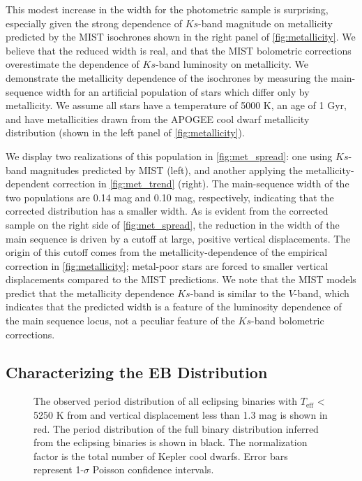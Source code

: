 \documentclass[twocolumn]{aastex6}
\newcommand{\Teff}{\ensuremath{T_{\textrm{eff}}}}
\begin{document}
This modest increase in the width for the photometric sample is surprising,
especially given the strong dependence of \(Ks\)-band magnitude on metallicity 
predicted by the MIST isochrones shown in the right panel of 
\cref{fig:metallicity}. We believe that the reduced width is real, and that 
the MIST bolometric corrections overestimate the dependence of \(Ks\)-band 
luminosity on metallicity. We demonstrate the metallicity dependence of 
the isochrones by measuring the 
main-sequence width for an artificial population of stars which 
differ only by metallicity. We assume all stars have a temperature of 5000 K, 
an age of 1 Gyr, and have metallicities drawn from the APOGEE cool dwarf 
metallicity distribution (shown in the left panel of \cref{fig:metallicity}).

We display two realizations of this population in \cref{fig:met_spread}: one
using \(Ks\)-band magnitudes predicted by MIST (left), and another applying the
metallicity-dependent correction in \cref{fig:met_trend} (right).
The main-sequence width of the two populations are 0.14 mag and 0.10 mag, 
respectively, indicating that the corrected distribution has a smaller width. 
As is evident from the corrected sample on the right side of 
\cref{fig:met_spread}, the reduction in the width of the main 
sequence is driven by a cutoff at large, positive vertical displacements.
The origin of this cutoff comes from the metallicity-dependence of the empirical 
correction in \cref{fig:metallicity}; metal-poor stars are forced to smaller 
vertical displacements compared to the MIST predictions. We note that the MIST 
models predict that the metallicity dependence \(Ks\)-band is similar to the
\(V\)-band, which indicates that the predicted width is a feature of the 
luminosity dependence of the main sequence locus, not a peculiar feature of 
the \(Ks\)-band bolometric corrections.  

\subsection{Characterizing the EB Distribution}
\label{sec:ebmodel}

\begin{figure}[htb]
    \centering
    \caption{The observed period distribution of all eclipsing binaries with
    \Teff{} < 5250 K from \citet{Pinsonneault12} and vertical displacement less
than 1.3 mag is shown in red. The period distribution of the full binary
distribution inferred from the eclipsing binaries is shown in black. The
normalization factor is the total number of Kepler cool dwarfs. Error bars
represent 1-\(\sigma\) Poisson confidence intervals.}\label{fig:ebdist}
\end{figure}
\end{document}
